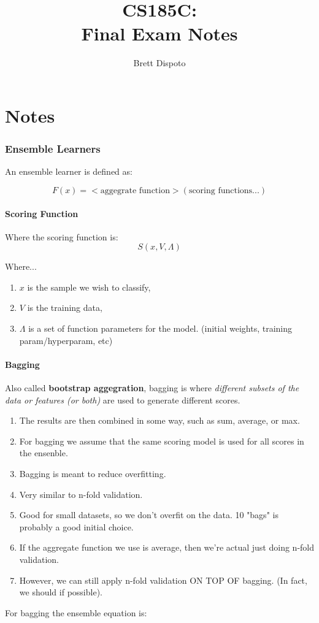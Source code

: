 \documentclass[12pt]{article}
\title{CS185C: \\ 
Final Exam Notes}
\author{Brett Dispoto}
\begin{document}
\maketitle

\part{Notes}
\section{Ensemble Learners}
An ensemble learner is defined as:

\begin{equation}
  F(x) = <\text{aggegrate function}>(\text{scoring functions...})
\end{equation}

\subsection{Scoring Function}
Where the scoring function is:
\begin{equation}
  S(x, V, \Lambda)
\end{equation}

Where...
\begin{enumerate}
  \item $x$ is the sample we wish to classify,
  \item $V$ is the training data,
  \item $\Lambda$ is a set of function parameters for the model. (initial weights, training param/hyperparam, etc)
\end{enumerate}


\subsection{Bagging}
Also called \textbf{bootstrap aggegration}, bagging is where \textit{different subsets of the data or features (or both)} are used to generate different scores.
\begin{enumerate}
  \item The results are then combined in some way, such as sum, average, or max.
  \item For bagging we assume that the same scoring model is used for all scores in the ensenble. 
  \item Bagging is meant to reduce overfitting.
  \item Very similar to n-fold validation.
  \item Good for small datasets, so we don't overfit on the data. 10 "bags" is probably a good initial choice.
  \item If the aggregate function we use is average, then we're actual just doing n-fold validation. 
  \item However, we can still apply n-fold validation ON TOP OF bagging. (In fact, we should if possible).
\end{enumerate}
For bagging the ensemble equation is:
\end{document}

